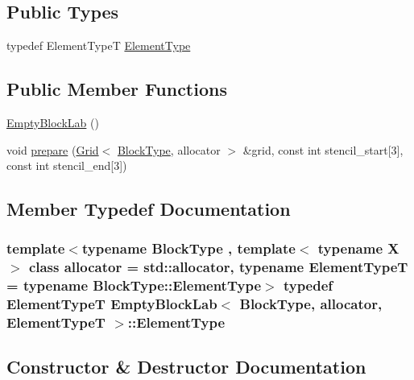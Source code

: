 \subsection*{Public Types}
\begin{DoxyCompactItemize}
\item 
typedef Element\+Type\+T \hyperlink{class_empty_block_lab_a090310d2af6fb159b6fe949413cbd47a}{Element\+Type}
\end{DoxyCompactItemize}
\subsection*{Public Member Functions}
\begin{DoxyCompactItemize}
\item 
\hyperlink{class_empty_block_lab_a8311d174957e8254a665b5b23c38e844}{Empty\+Block\+Lab} ()
\item 
void \hyperlink{class_empty_block_lab_acc1e6ead590c67446bee384eb3a3ec49}{prepare} (\hyperlink{class_grid}{Grid}$<$ \hyperlink{class_block_lab_a745b3c9ac17f6743d11a7085196981a0}{Block\+Type}, allocator $>$ \&grid, const int stencil\+\_\+start\mbox{[}3\mbox{]}, const int stencil\+\_\+end\mbox{[}3\mbox{]})
\end{DoxyCompactItemize}


\subsection{Member Typedef Documentation}
\hypertarget{class_empty_block_lab_a090310d2af6fb159b6fe949413cbd47a}{}
\subsubsection[{Element\+Type}]{\setlength{\rightskip}{0pt plus 5cm}template$<$typename Block\+Type , template$<$ typename X $>$ class allocator = std\+::allocator, typename Element\+Type\+T  = typename Block\+Type\+::\+Element\+Type$>$ typedef Element\+Type\+T {\bf Empty\+Block\+Lab}$<$ {\bf Block\+Type}, allocator, Element\+Type\+T $>$\+::{\bf Element\+Type}}\label{class_empty_block_lab_a090310d2af6fb159b6fe949413cbd47a}


\subsection{Constructor \& Destructor Documentation}
\hypertarget{class_empty_block_lab_a8311d174957e8254a665b5b23c38e844}{}
